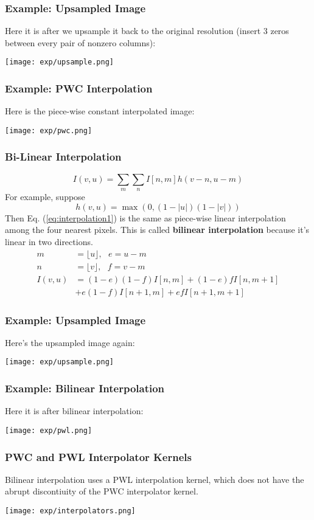 \documentclass{beamer}
\begin{document}
\begin{frame}
  \frametitle{Example: Upsampled Image} Here it is after we upsample
  it back to the original resolution (insert 3 zeros between every
  pair of nonzero columns):
  \centerline{\texttt{[image: exp/upsample.png]}}
\end{frame}

\begin{frame}
  \frametitle{Example: PWC Interpolation}

  Here is the piece-wise constant interpolated image:
  \centerline{\texttt{[image: exp/pwc.png]}}
\end{frame}

\begin{frame}
  \frametitle{Bi-Linear Interpolation}
  \[
  I(v,u) = \sum_m\sum_n I[n,m] h(v-n,u-m)
  \]
  For example, suppose
  \[
  h(v,u) = \max\left(0,(1-|u|)(1-|v|)\right)
  \]
  Then Eq. (\ref{eq:interpolation1}) is the same as piece-wise linear
  interpolation among the four nearest pixels.  This is called {\bf
    bilinear interpolation} because it's linear in two directions.
  \begin{align*}
    m &= \lfloor u\rfloor,~~~e=u-m\\
    n &= \lfloor v\rfloor,~~~f=v-m\\
    I(v,u) &= (1-e)(1-f)I[n,m]+(1-e)fI[n,m+1]\\
    &+e(1-f)I[n+1,m]+efI[n+1,m+1]
  \end{align*}
\end{frame}

\begin{frame}
  \frametitle{Example: Upsampled Image}

  Here's the upsampled image again:
  \centerline{\texttt{[image: exp/upsample.png]}}
\end{frame}

\begin{frame}
  \frametitle{Example: Bilinear Interpolation}

  Here it is after bilinear interpolation:
  \centerline{\texttt{[image: exp/pwl.png]}}
\end{frame}


\begin{frame}
  \frametitle{PWC and PWL Interpolator Kernels}

  Bilinear interpolation uses a PWL interpolation kernel, which does
  not have the abrupt discontiuity of the PWC interpolator kernel.
  \centerline{\texttt{[image: exp/interpolators.png]}}
\end{frame}
\end{document}
